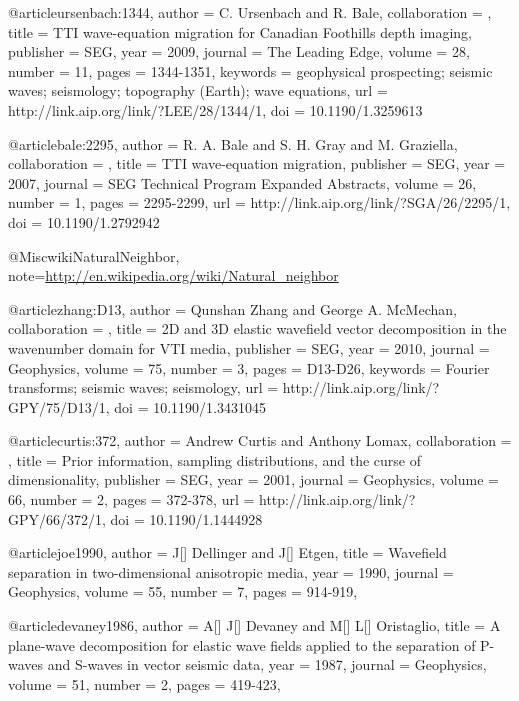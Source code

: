 {@article{ursenbach:1344,
author = {C. Ursenbach and R. Bale},
collaboration = {},
title = {TTI wave-equation migration for Canadian Foothills depth imaging},
publisher = {SEG},
year = {2009},
journal = {The Leading Edge},
volume = {28},
number = {11},
pages = {1344-1351},
keywords = {geophysical prospecting; seismic waves; seismology; topography (Earth); wave equations},
url = {http://link.aip.org/link/?LEE/28/1344/1},
doi = {10.1190/1.3259613}
}







@article{bale:2295,
author = {R. A. Bale and S. H. Gray and M. Graziella},
collaboration = {},
title = {TTI wave-equation migration},
publisher = {SEG},
year = {2007},
journal = {SEG Technical Program Expanded Abstracts},
volume = {26},
number = {1},
pages = {2295-2299},
url = {http://link.aip.org/link/?SGA/26/2295/1},
doi = {10.1190/1.2792942}
}


@Misc{wikiNaturalNeighbor,
  note={\url{http://en.wikipedia.org/wiki/Natural_neighbor}  }
}



@article{zhang:D13,
author = {Qunshan Zhang and George A. McMechan},
collaboration = {},
title = {2{D} and 3{D} elastic wavefield vector decomposition in the wavenumber domain for VTI media},
publisher = {SEG},
year = {2010},
journal = {Geophysics},
volume = {75},
number = {3},
pages = {D13-D26},
keywords = {Fourier transforms; seismic waves; seismology},
url = {http://link.aip.org/link/?GPY/75/D13/1},
doi = {10.1190/1.3431045}
}



@article{curtis:372,
author = {Andrew Curtis and Anthony Lomax},
collaboration = {},
title = {Prior information, sampling distributions, and the curse of dimensionality},
publisher = {SEG},
year = {2001},
journal = {Geophysics},
volume = {66},
number = {2},
pages = {372-378},
url = {http://link.aip.org/link/?GPY/66/372/1},
doi = {10.1190/1.1444928}
}

@article{joe1990,
author = {J[] Dellinger and J[] Etgen},
title = {Wavefield separation in two-dimensional anisotropic media},
year = {1990},
journal = {Geophysics},
volume = {55},
number = {7},
pages = {914-919},
}

@article{devaney1986,
author = {A[] J[] Devaney and M[] L[] Oristaglio},
title = {A plane-wave decomposition for elastic wave fields applied to the separation of P-waves and S-waves in vector seismic data},
year = {1987},
journal = {Geophysics},
volume = {51},
number = {2},
pages = {419-423},
}

}
